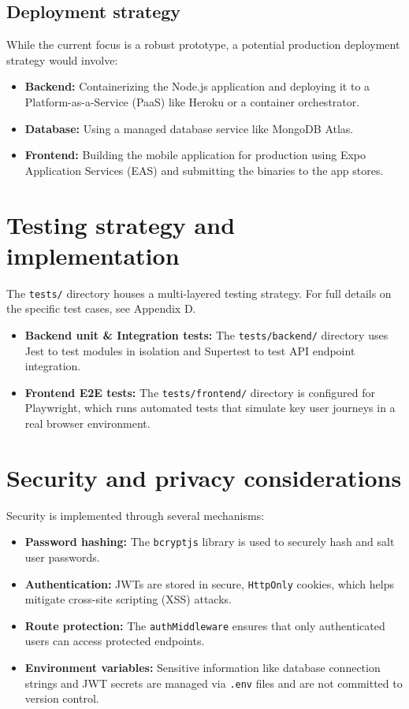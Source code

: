 \subsection{Deployment strategy}
While the current focus is a robust prototype, a potential production deployment strategy would involve:
\begin{itemize}
    \item \textbf{Backend:} Containerizing the Node.js application and deploying it to a Platform-as-a-Service (PaaS) like Heroku or a container orchestrator.
    \item \textbf{Database:} Using a managed database service like MongoDB Atlas.
    \item \textbf{Frontend:} Building the mobile application for production using Expo Application Services (EAS) and submitting the binaries to the app stores.
\end{itemize}

\section{Testing strategy and implementation}
The \texttt{tests/} directory houses a multi-layered testing strategy. For full details on the specific test cases, see Appendix D.
\begin{itemize}
    \item \textbf{Backend unit \& Integration tests:} The \texttt{tests/backend/} directory uses Jest to test modules in isolation and Supertest to test API endpoint integration.
    \item \textbf{Frontend E2E tests:} The \texttt{tests/frontend/} directory is configured for Playwright, which runs automated tests that simulate key user journeys in a real browser environment.
\end{itemize}

\section{Security and privacy considerations}
Security is implemented through several mechanisms:
\begin{itemize}
    \item \textbf{Password hashing:} The \texttt{bcryptjs} library is used to securely hash and salt user passwords.
    \item \textbf{Authentication:} JWTs are stored in secure, \texttt{HttpOnly} cookies, which helps mitigate cross-site scripting (XSS) attacks.
    \item \textbf{Route protection:} The \texttt{authMiddleware} ensures that only authenticated users can access protected endpoints.
    \item \textbf{Environment variables:} Sensitive information like database connection strings and JWT secrets are managed via \texttt{.env} files and are not committed to version control.
\end{itemize}
